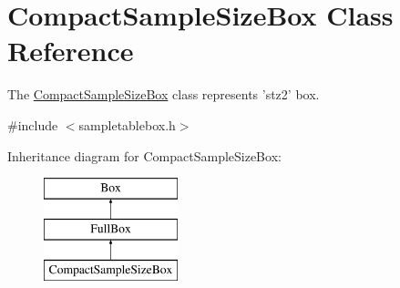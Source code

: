 \hypertarget{class_compact_sample_size_box}{\section{Compact\-Sample\-Size\-Box Class Reference}
\label{class_compact_sample_size_box}
}


The \hyperlink{class_compact_sample_size_box}{Compact\-Sample\-Size\-Box} class represents 'stz2' box.  




{\ttfamily \#include $<$sampletablebox.\-h$>$}

Inheritance diagram for Compact\-Sample\-Size\-Box\-:\begin{figure}[H]
\begin{center}
\leavevmode
\includegraphics[height=3.000000cm]{class_compact_sample_size_box}
\end{center}
\end{figure}
